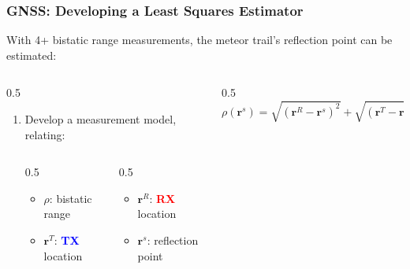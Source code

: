 \begin{frame}[label=gnss_ls_bk]
    \frametitle{GNSS: Developing a Least Squares Estimator}
    With 4+ bistatic range measurements, the meteor trail's reflection point can be estimated: 
    \begin{columns}
        \begin{column}{0.5\textwidth}
            {\setlength{\leftmargini}{1em} \begin{enumerate}
                \item Develop a \alert{ measurement model}, relating:  
                \begin{columns}
                    \begin{column}{0.5\linewidth }
                        {\setlength{\leftmargini}{3em} \begin{itemize} \scriptsize
                            \item[\(\blacktriangleright\)] \(\rho\): bistatic range
                            \item[\(\blacktriangleright\)] \(\mathbf{r}^{T}\): \textcolor{blue}{\textbf{TX}} location
                        \end{itemize}}
                    \end{column}
                    \begin{column}{0.5\linewidth}
                        \begin{itemize} \scriptsize
                            \item[\(\blacktriangleright\)] \(\mathbf{r}^R\): \textcolor{red}{\textbf{RX}} location
                            \item[\(\blacktriangleright\)] \(\mathbf{r}^s\): reflection point 
                        \end{itemize}
                    \end{column}
                \end{columns}                
            \end{enumerate}}
        \end{column}
        \begin{column}{0.5\textwidth}
            \scriptsize \begin{equation*} 
                \rho\left( \mathbf{r}^{s} \right) = \sqrt{\left( \mathbf{r}^{R}-\mathbf{r}^{s} \right)^{2}} + \sqrt{\left( \mathbf{r}^{T}-\mathbf{r}^{s} \right)^{2}} + \varepsilon
            \end{equation*}
        \end{column}

\end{columns}
\end{frame}
